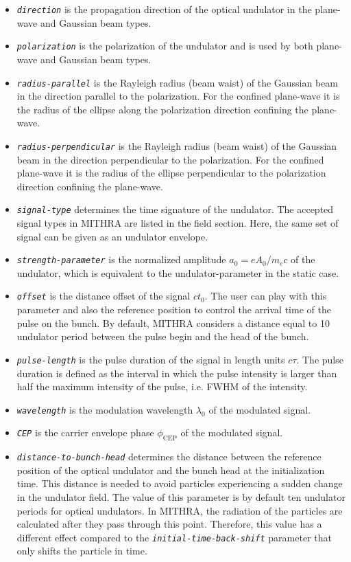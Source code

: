 \begin{enumerate}
\begin{itemize}
	\item {\tt \small \em direction} is the propagation direction of the optical undulator in the plane-wave and Gaussian beam types.
	\item {\tt \small \em polarization} is the polarization of the undulator and is used by both plane-wave and Gaussian beam types.
	\item {\tt \small \em radius-parallel} is the Rayleigh radius (beam waist) of the Gaussian beam in the direction parallel to the polarization. For the confined plane-wave it is the radius of the ellipse along the polarization direction confining the plane-wave.
	\item {\tt \small \em radius-perpendicular} is the Rayleigh radius (beam waist) of the Gaussian beam in the direction perpendicular to the polarization. For the confined plane-wave it is the radius of the ellipse perpendicular to the polarization direction confining the plane-wave.
	\item {\tt \small \em signal-type} determines the time signature of the undulator. The accepted signal types in MITHRA are listed in the field section. Here, the same set of signal can be given as an undulator envelope.
	\item {\tt \small \em strength-parameter} is the normalized amplitude $a_0 = e A_0 / m_ec $ of the undulator, which is equivalent to the undulator-parameter in the static case.
	\item {\tt \small \em offset} is the distance offset of the signal $ct_0$. The user can play with this parameter and also the reference position to control the arrival time of the pulse on the bunch. By default, MITHRA considers a distance equal to 10 undulator period between the pulse begin and the head of the bunch.
	\item {\tt \small \em pulse-length} is the pulse duration of the signal in length units $c\tau$. The pulse duration is defined as the interval in which the pulse intensity is larger than half the maximum intensity of the pulse, i.e. FWHM of the intensity.
	\item {\tt \small \em wavelength} is the modulation wavelength $\lambda_0$ of the modulated signal.
	\item {\tt \small \em CEP} is the carrier envelope phase $\phi_{\mathrm{CEP}}$ of the modulated signal.
	\item {\tt \small \em distance-to-bunch-head} determines the distance between the reference position of the optical undulator and the bunch head at the initialization time. This distance is needed to avoid particles experiencing a sudden change in the undulator field. The value of this parameter is by default ten undulator periods for optical undulators. In MITHRA, the radiation of the particles are calculated after they pass through this point. Therefore, this value has a different effect compared to the {\tt \small \em initial-time-back-shift} parameter that only shifts the particle in time.
\end{itemize}
%
\end{enumerate}

